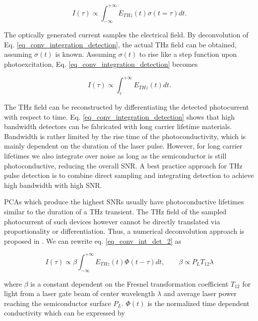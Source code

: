 \begin{equation}
	I(\tau) \propto \int_{-\infty}^{+\infty} E_{THz}(t)\sigma(t = \tau)dt.
	\label{eq_conv_integration_detection}
\end{equation}

The optically generated current samples the electrical field. 
By deconvolution of Eq. \ref{eq_conv_integration_detection}, the actual THz field can be obtained, assuming $\sigma(t)$ is known. Assuming $\sigma(t)$ to rise like a step function upon photoexcitation, Eq. \ref{eq_conv_integration_detection} becomes 

\begin{equation}
	I(\tau) \propto  \int_{\tau}^{+\infty} E_{THz}(t)dt.
	\label{eq_conv_int_det_2}
\end{equation}

The THz field can be reconstructed by differentiating the detected photocurrent with respect to time. Eq. \ref{eq_conv_integration_detection} shows that high bandwidth detectors can be fabricated with long carrier lifetime materials. Bandwidth is rather limited by the rise time of the photoconductivity, which is mainly dependent on the duration of the laser pulse. However, for long carrier lifetimes we also integrate over noise as long as the semiconductor is still photoconductive, reducing the overall SNR. A best practice approach for THz pulse detection is to combine direct sampling and integrating detection to achieve high bandwidth with high SNR. 

PCAs which produce the highest SNRs usually have photoconductive lifetimes similar to the duration of a THz transient. The THz field of the sampled photocurrent of such devices however cannot be directly translated via proportionality or differentiation. Thus, a numerical deconvolution approach is proposed in \cite{castro-camusPhotoconductiveResponseCorrection2008}. We can rewrite eq. \ref{eq_conv_int_det_2} as 

\begin{equation}
		I(\tau) \propto \beta \int_{-\infty}^{+\infty} E_{THz}(t)\Phi(t - \tau)dt,
		\qquad \beta \propto P_L T_{12} \lambda
	\label{eq_conv_integration_detection_2}
\end{equation}

where $\beta$ is a constant dependent on the Fresnel transformation coefficient $T_{12}$ for light from a laser gate beam of center wavelength $\lambda$ and average laser power reaching the semiconductor surface $P_L$. $\Phi(t)$ is the normalized time dependent conductivity which can be expressed by 

